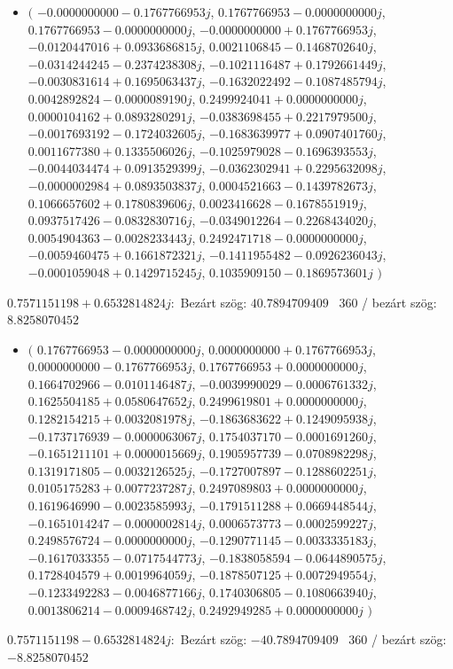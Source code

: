 \documentclass[14pt,a4paper]{article}
\begin{document}
\begin{itemize}
\item
$\big($
$-0.0000000000-0.1767766953j$, $0.1767766953-0.0000000000j$, $0.1767766953-0.0000000000j$, $-0.0000000000+0.1767766953j$, $-0.0120447016+0.0933686815j$, $0.0021106845-0.1468702640j$, $-0.0314244245-0.2374238308j$, $-0.1021116487+0.1792661449j$, $-0.0030831614+0.1695063437j$, $-0.1632022492-0.1087485794j$, $0.0042892824-0.0000089190j$, $0.2499924041+0.0000000000j$, $0.0000104162+0.0893280291j$, $-0.0383698455+0.2217979500j$, $-0.0017693192-0.1724032605j$, $-0.1683639977+0.0907401760j$, $0.0011677380+0.1335506026j$, $-0.1025979028-0.1696393553j$, $-0.0044034474+0.0913529399j$, $-0.0362302941+0.2295632098j$, $-0.0000002984+0.0893503837j$, $0.0004521663-0.1439782673j$, $0.1066657602+0.1780839606j$, $0.0023416628-0.1678551919j$, $0.0937517426-0.0832830716j$, $-0.0349012264-0.2268434020j$, $0.0054904363-0.0028233443j$, $0.2492471718-0.0000000000j$, $-0.0059460475+0.1661872321j$, $-0.1411955482-0.0926236043j$, $-0.0001059048+0.1429715245j$, $0.1035909150-0.1869573601j$
$\big)$
\end{itemize}
$0.7571151198+0.6532814824j$:\
Bezárt szög: $40.7894709409$ \
360 / bezárt szög: $8.8258070452$\
\begin{itemize}
\item
$\big($
$0.1767766953-0.0000000000j$, $0.0000000000+0.1767766953j$, $0.0000000000-0.1767766953j$, $0.1767766953+0.0000000000j$, $0.1664702966-0.0101146487j$, $-0.0039990029-0.0006761332j$, $0.1625504185+0.0580647652j$, $0.2499619801+0.0000000000j$, $0.1282154215+0.0032081978j$, $-0.1863683622+0.1249095938j$, $-0.1737176939-0.0000063067j$, $0.1754037170-0.0001691260j$, $-0.1651211101+0.0000015669j$, $0.1905957739-0.0708982298j$, $0.1319171805-0.0032126525j$, $-0.1727007897-0.1288602251j$, $0.0105175283+0.0077237287j$, $0.2497089803+0.0000000000j$, $0.1619646990-0.0023585993j$, $-0.1791511288+0.0669448544j$, $-0.1651014247-0.0000002814j$, $0.0006573773-0.0002599227j$, $0.2498576724-0.0000000000j$, $-0.1290771145-0.0033335183j$, $-0.1617033355-0.0717544773j$, $-0.1838058594-0.0644890575j$, $0.1728404579+0.0019964059j$, $-0.1878507125+0.0072949554j$, $-0.1233492283-0.0046877166j$, $0.1740306805-0.1080663940j$, $0.0013806214-0.0009468742j$, $0.2492949285+0.0000000000j$
$\big)$
\end{itemize}
$0.7571151198-0.6532814824j$:\
Bezárt szög: $-40.7894709409$ \
360 / bezárt szög: $-8.8258070452$\
\end{document}
